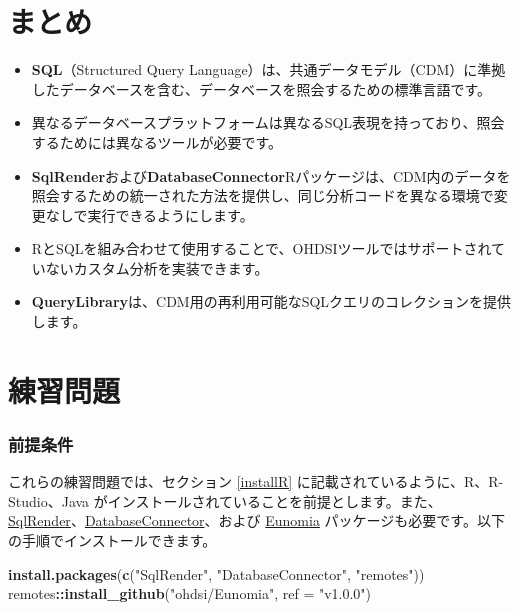 \documentclass[
  11pt]{book}
\makeatletter
\newenvironment{Shaded}{\begin{snugshade}}{\end{snugshade}}
\newcommand{\AttributeTok}[1]{\textcolor[rgb]{0.13,0.29,0.53}{#1}}
\newcommand{\FunctionTok}[1]{\textcolor[rgb]{0.13,0.29,0.53}{\textbf{#1}}}
\newcommand{\NormalTok}[1]{#1}
\newcommand{\SpecialCharTok}[1]{\textcolor[rgb]{0.81,0.36,0.00}{\textbf{#1}}}
\newcommand{\StringTok}[1]{\textcolor[rgb]{0.31,0.60,0.02}{#1}}
\newenvironment{kframe}{%
\medskip{}
\setlength{\fboxsep}{.8em}
 \def\at@end@of@kframe{}%
 \ifinner\ifhmode%
  \def\at@end@of@kframe{\end{minipage}}%
  \begin{minipage}{\columnwidth}%
 \fi\fi%
 \def\FrameCommand##1{\hskip\@totalleftmargin \hskip-\fboxsep
 \colorbox{myShadeColor}{##1}\hskip-\fboxsep
     \hskip-\linewidth \hskip-\@totalleftmargin \hskip\columnwidth}%
 \MakeFramed {\advance\hsize-\width
   \@totalleftmargin\z@ \linewidth\hsize
   \@setminipage}}%
 {\par\unskip\endMakeFramed%
 \at@end@of@kframe}
\newenvironment{rmdblock}[1]
  {
  \begin{itemize}
  \renewcommand{\labelitemi}{
    \raisebox{-.7\height}[0pt][0pt]{
      {\setkeys{Gin}{width=3em,keepaspectratio}\texttt{[image: images/\#1]}}
    }
  }
  \setlength{\fboxsep}{1em}
  \begin{kframe}
  \item
  }
  {
  \end{kframe}
  \end{itemize}
  }
\newenvironment{rmdsummary}
  {\begin{rmdblock}{summary}}
  {\end{rmdblock}}
\theoremstyle{definition}
\theoremstyle{definition}
\theoremstyle{definition}
\theoremstyle{definition}
\theoremstyle{remark}
\makeatother
\begin{document}
\section{まとめ}\label{ux307eux3068ux3081-7}

\begin{rmdsummary}
\begin{itemize}
\item
  \textbf{SQL}（Structured Query Language）は、共通データモデル（CDM）に準拠したデータベースを含む、データベースを照会するための標準言語です。
\item
  異なるデータベースプラットフォームは異なるSQL表現を持っており、照会するためには異なるツールが必要です。
\item
  \textbf{SqlRender}および\textbf{DatabaseConnector}Rパッケージは、CDM内のデータを照会するための統一された方法を提供し、同じ分析コードを異なる環境で変更なしで実行できるようにします。
\item
  RとSQLを組み合わせて使用することで、OHDSIツールではサポートされていないカスタム分析を実装できます。
\item
  \textbf{QueryLibrary}は、CDM用の再利用可能なSQLクエリのコレクションを提供します。
\end{itemize}
\end{rmdsummary}

\section{練習問題}\label{ux7df4ux7fd2ux554fux984c-1}

\subsubsection*{前提条件}\label{ux524dux63d0ux6761ux4ef6-3}

これらの練習問題では、セクション \ref{installR} に記載されているように、R、R-Studio、Java がインストールされていることを前提とします。また、\href{https://ohdsi.github.io/SqlRender/}{SqlRender}、\href{https://ohdsi.github.io/DatabaseConnector/}{DatabaseConnector}、および \href{https://ohdsi.github.io/Eunomia/}{Eunomia} パッケージも必要です。以下の手順でインストールできます。

\begin{Shaded}
\begin{Highlighting}[]
\FunctionTok{install.packages}\NormalTok{(}\FunctionTok{c}\NormalTok{(}\StringTok{"SqlRender"}\NormalTok{, }\StringTok{"DatabaseConnector"}\NormalTok{, }\StringTok{"remotes"}\NormalTok{))}
\NormalTok{remotes}\SpecialCharTok{::}\FunctionTok{install\_github}\NormalTok{(}\StringTok{"ohdsi/Eunomia"}\NormalTok{, }\AttributeTok{ref =} \StringTok{"v1.0.0"}\NormalTok{)}
\end{Highlighting}
\end{Shaded}
\end{document}
